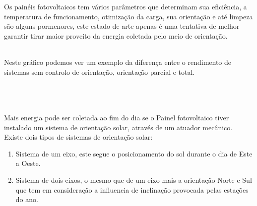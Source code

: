 \qquad Os painéis fotovoltaicos tem vários parâmetros que determinam sua eficiência, a temperatura de funcionamento, otimização da carga, sua orientação e até limpeza são alguns pormenores, este estado de arte apenas é uma tentativa de melhor garantir tirar maior proveito da energia coletada pelo meio de orientação.\\
\\
\hspace{0.2cm}
\begin{minipage}[!t]{0.5\linewidth}
\flushleft
 Neste gráfico podemos ver um exemplo da diferença entre o rendimento de sistemas sem controlo de orientação, orientação parcial e total.\\
\vspace{7cm}
\end{minipage}\\
\\
\\
Mais energia pode ser coletada ao fim do dia se o Painel fotovoltaico tiver instalado um sistema de orientação solar, através de um atuador mecânico.\\
Existe dois tipos de sistemas de orientação solar:\cite{book_2}
\begin{enumerate}
	\setlength\itemsep{-0.1em}
	\item Sistema de um eixo, este segue o posicionamento do sol durante o dia de Este a Oeste.
	\item Sistema de dois eixos, o mesmo que de um eixo mais a orientação Norte e Sul que tem  em consideração a influencia de inclinação provocada pelas estações do ano.
\end{enumerate}




